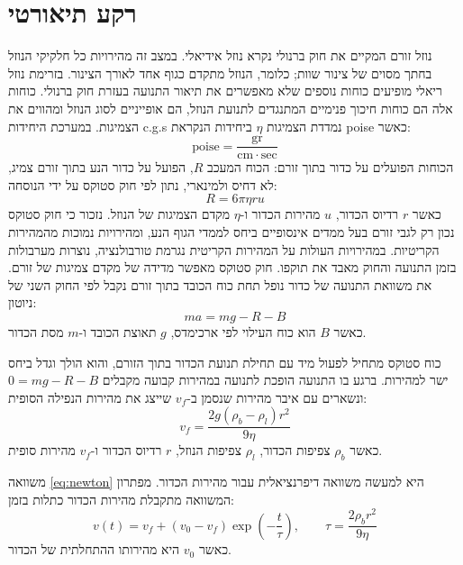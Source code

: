 \documentclass[10pt,a4paper]{article}
\newcommand{\textenglish}[1]{\foreignlanguage{english}{#1}}
\begin{document}
\section*{רקע תיאורטי}
נוזל זורם המקיים את חוק ברנולי נקרא נוזל אידיאלי. במצב זה מהירויות כל חלקיקי הנוזל בחתך מסוים של צינור שוות; כלומר, הנוזל מתקדם כגוף אחד לאורך הצינור. בזרימת נוזל ריאלי מופיעים כוחות נוספים שלא מאפשרים את תיאור התנועה בעזרת חוק ברנולי. כוחות אלה הם כוחות חיכוך פנימיים המתנגדים לתנועת הנוזל, הם אופייניים לסוג הנוזל ומהווים את הצמיגות. במערכת היחידות \textenglish{c.g.s} נמדדת הצמיגות $\eta$ ביחידות הנקראת \textenglish{poise} כאשר:
\[
\mathrm{poise} = \frac{\mathrm{gr}}{\mathrm{cm} \cdot \mathrm{sec}}
\]
הכוחות הפועלים על כדור בתוך זורם: הכוח המעכב $R$, הפועל על כדור הנע בתוך זורם צמיג, לא דחיס ולמינארי, נתון לפי חוק סטוקס על ידי הנוסחה:
\begin{equation}\label{eq:stokes}
R = 6\pi\eta r u
\end{equation}
כאשר $r$ רדיוס הכדור, $u$ מהירות הכדור ו-$\eta$ מקדם הצמיגות של הנוזל. נזכור כי חוק סטוקס נכון רק לגבי זורם בעל ממדים אינסופיים ביחס לממדי הגוף הנע, ומהירויות נמוכות מהמהירות הקריטיות. במהירויות העולות על המהירות הקריטית נגרמת טורבולנציה, נוצרות מערבולות בזמן התנועה והחוק מאבד את תוקפו. חוק סטוקס מאפשר מדידה של מקדם צמיגות של זורם. את משוואת התנועה של כדור נופל תחת כוח הכובד בתוך זורם נקבל לפי החוק השני של ניוטון:
\begin{equation}\label{eq:newton}
ma = mg - R - B
\end{equation}
כאשר $B$ הוא כוח העילוי לפי ארכימדס, $g$ תאוצת הכובד ו-$m$ מסת הכדור.

כוח סטוקס מתחיל לפעול מיד עם תחילת תנועת הכדור בתוך הזורם, והוא הולך וגדל ביחס ישר למהירות. ברגע בו התנועה הופכת לתנועה במהירות קבועה מקבלים $0 = mg - R - B$ ונשארים עם איבר מהירות שנסמן ב-$v_f$ שייצג את מהירות הנפילה הסופית:
\begin{equation}\label{eq:vf}
v_f = \frac{2g(\rho_b - \rho_l)r^2}{9\eta}
\end{equation}
כאשר $\rho_b$ צפיפות הכדור, $\rho_l$ צפיפות הנוזל, $r$ רדיוס הכדור ו-$v_f$ מהירות סופית.

משוואה \eqref{eq:newton} היא למעשה משוואה דיפרנציאלית עבור מהירות הכדור. מפתרון המשוואה מתקבלת מהירות הכדור כתלות בזמן:
\begin{equation}\label{eq:vt}
v(t) = v_f + (v_0 - v_f)\exp\left(-\frac{t}{\tau}\right), \qquad \tau = \frac{2\rho_b r^2}{9\eta}
\end{equation}
כאשר $v_0$ היא מהירותו ההתחלתית של הכדור.
\end{document}
